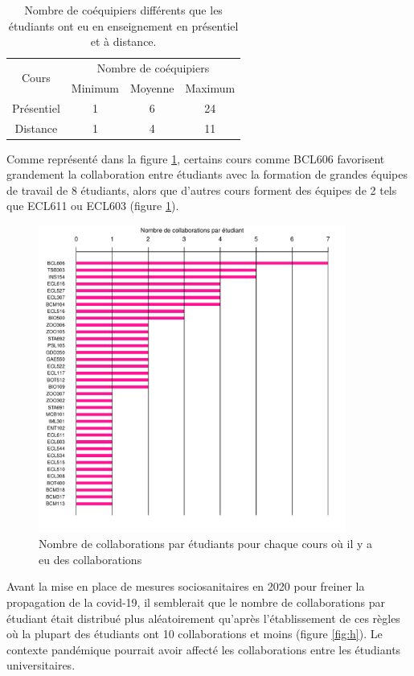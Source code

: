 \documentclass{article}
\begin{document}
\hfill \break
\begin{table}[ht]
\caption{Nombre de coéquipiers différents que les étudiants ont eu en enseignement en présentiel et à distance. }
\label{tab:coe}
\centering
\begin{tabular}{|c|c|c|c|}
    \hline
    \multirow{2}{*}{Cours}&\multicolumn{3}{c|}{Nombre de coéquipiers}\\
    \cline{2-4}
    &Minimum&Moyenne&Maximum\\
    \hline
    Présentiel&1&6&24\\
    \hline
    Distance&1&4&11\\
    \hline
\end{tabular}
\end{table}

\hfill \break   
    Comme représenté dans la figure \ref{fig:d}, certains cours comme BCL606 favorisent grandement la collaboration entre étudiants avec la formation de grandes équipes de travail de 8 étudiants, alors que d’autres cours forment des équipes de 2 tels que ECL611 ou ECL603 (figure \ref{fig:d}).
\hfill \break
\begin{figure}[h]
\centering
\includegraphics[width=0.90\textwidth]{figure_collaborations_etudiant.pdf}
\caption{Nombre de collaborations par étudiants pour chaque cours où il y a eu des collaborations}
\label{fig:d}
\end{figure}
\clearpage
    Avant la mise en place de mesures sociosanitaires en 2020 pour freiner la propagation de la covid-19, il semblerait que le nombre de collaborations par étudiant était distribué plus aléatoirement qu’après l’établissement de ces règles où la plupart des étudiants ont 10 collaborations et moins (figure \ref{fig:h}). Le contexte pandémique pourrait avoir affecté les collaborations entre les étudiants universitaires.
\end{document}
